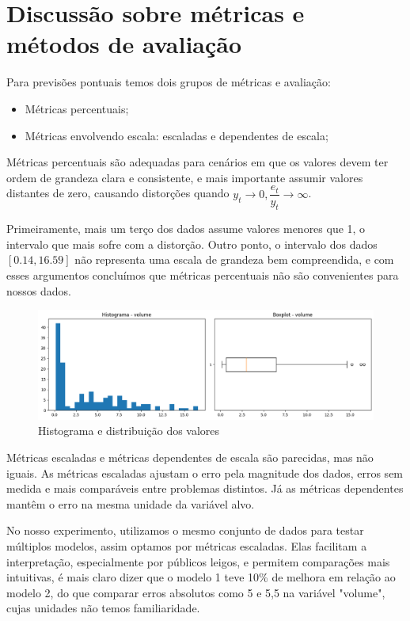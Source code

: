 \documentclass{article}
\begin{document}
\section{Discussão sobre métricas e métodos de avaliação}

Para previsões pontuais temos dois grupos de métricas e avaliação:
\begin{itemize}
    \item Métricas percentuais;
    \item Métricas envolvendo escala: escaladas e dependentes de escala;
\end{itemize}
Métricas percentuais são adequadas para cenários em que os valores devem ter ordem de grandeza clara e consistente, e mais importante assumir valores distantes de zero, causando distorções quando $y_t \to 0, \dfrac{e_t}{y_t} \to \infty$.

 Primeiramente, mais um terço dos dados assume valores menores que 1, o intervalo que mais sofre com a distorção. Outro ponto, o intervalo dos dados $[0.14 , 16.59]$ não representa uma escala de grandeza bem compreendida, e com esses argumentos concluímos que métricas percentuais não são convenientes para nossos dados.

\begin{figure}[h]
    \centering
    \includegraphics[width=0.75\linewidth]{images/histogram.png}
    \caption{Histograma e distribuição dos valores}
\end{figure}

Métricas escaladas e métricas dependentes de escala são parecidas, mas não iguais. As métricas escaladas ajustam o erro pela magnitude dos dados, erros sem medida e mais comparáveis entre problemas distintos. Já as métricas dependentes mantêm o erro na mesma unidade da variável alvo.

No nosso experimento, utilizamos o mesmo conjunto de dados para testar múltiplos modelos, assim optamos por métricas escaladas. Elas facilitam a interpretação, especialmente por públicos leigos, e permitem comparações mais intuitivas, é mais claro dizer que o modelo 1 teve 10\% de melhora em relação ao modelo 2, do que comparar erros absolutos como 5 e 5,5 na variável "volume", cujas unidades não temos familiaridade.
\end{document}
